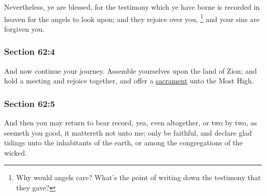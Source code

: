 		Nevertheless, ye are blessed, for the testimony which ye have borne is recorded in heaven for the angels to look upon; and they rejoice over you,%
			\footnote{%
				Why would angels care? What's the point of writing down the testimony that they gave?
				}
		and your sins are forgiven you.


	\subsubsection{Section 62:4} %
		\label{DC62-4}

		And now continue your journey.  Assemble yourselves upon the land of Zion; and hold a meeting and rejoice together, and offer a \hyperref[SACRAMENT]{sacrament} unto the Most High.


	\subsubsection{Section 62:5} %
		\label{DC62-5}

		And then you may return to bear record, yea, even altogether, or two by two, as seemeth you good, it mattereth not unto me; only be faithful, and declare glad tidings unto the inhabitants of the earth, or among the congregations of the wicked.


